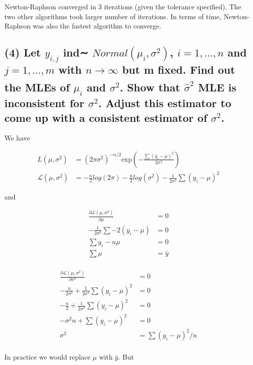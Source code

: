 \documentclass[11pt]{article}
\begin{document}
Newton-Raphson converged in 3 iterations (given the tolerance specified). The two other algorithms took larger number of iterations. In terms of time, Newton-Raphson was also the fastest algorithm to converge.

\subsection*{(4) Let $y_{i,j}$
ind∼ $Normal(\mu_i,\sigma^2)$, $i = 1,...,n$ and $j = 1,...,m$ with $n \xrightarrow[]{} \infty$
but m fixed. Find out the MLEs of $\mu_i$ and $\sigma^2$. Show that  $\hat{\sigma}^2$ MLE is inconsistent for $\sigma^2$. Adjust this estimator to come up with a consistent estimator of  $\sigma^2$.}

We have

\begin{align*}
    L(\mu, \sigma^2) &=  (2\pi \sigma^2)^{-n/2} \text{exp} \left(- \frac{\sum(y_i-\mu)^2}{2\sigma^2}\right)\\
    \mathcal{L}(\mu, \sigma^2) &= -\frac{n}{2}log(2\pi)  -\frac{n}{2}log(\sigma^2)  -\frac{1}{2\sigma^2}\sum(y_i-\mu)^2
\end{align*}

and 

\begin{align*}
    \frac{\partial \mathcal{L}(\mu, \sigma^2)}{\partial \mu} &= 0 \\
    -\frac{1}{2\sigma^2} \sum -2(y_i-\mu)&= 0 \\
     \sum y_i-n\mu&= 0 \\
     \sum \mu&= \bar{y} \\
\end{align*}

\begin{align*}
    \frac{\partial \mathcal{L}(\mu, \sigma^2)}{\partial \sigma^2} &= 0 \\
    -\frac{n}{2\sigma^2} + \frac{1}{2\sigma^4}\sum (y_i - \mu)^2&= 0 \\
     -\frac{n}{2} + \frac{1}{2\sigma^2}\sum (y_i - \mu)^2&= 0 \\
     -\sigma^2n +\sum (y_i - \mu)^2&= 0 \\
     \sigma^2 &= \sum (y_i - \mu)^2 / n \\
\end{align*}

In practice we would replace $\mu$ with $\bar{y}$. But
\end{document}

